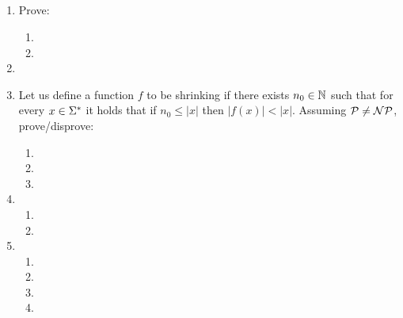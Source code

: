 \documentclass{article}
\title{
    \textmd{\bd{\hmwkClass:\ \hmwkTitle}}\\
}
\author{\hmwkAuthorName}
\begin{document}
\maketitle
\thispagestyle{firststyle}

\begin{enumerate}
    \item Prove:
          \begin{enumerate}
              \item 
                    \pagebreak
              \item 
          \end{enumerate}

          \pagebreak

    \item 

          \pagebreak

    \item Let us define a function $f$ to be shrinking if there exists $n_0 \in \mathbb{N}$ such that
          for every $x \in \Sigma^*$ it holds that if $n_0 \leq |x|$ then $|f(x)| < |x|$.
          Assuming $\mathcal{P} \neq \mathcal{N}\mathcal{P}$, prove/disprove:

          \begin{enumerate}
              \item 
              \item 
              \item 
          \end{enumerate}

          \pagebreak

    \item
          \begin{enumerate}
              \item 
              \item 
          \end{enumerate}

          \pagebreak

    \item
          \begin{enumerate}
              \item 
              \item 
              \item 
              \item 
          \end{enumerate}

\end{enumerate}
\end{document}
